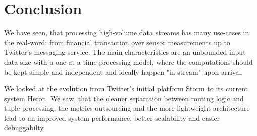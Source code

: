\documentclass[conference]{IEEEtran}
\begin{document}
\section{Conclusion}
\label{sec:Conclusion}

We have seen, that processing high-volume data streams has many use-cases in the real-word: from financial transaction over sensor measurements up to Twitter's messaging service.
The main characteristics are an unbounded input data size with a one-at-a-time processing model, where the computations should be kept simple and independent and ideally happen "in-stream" upon arrival.

We looked at the evolution from Twitter's initial platform Storm to its current system Heron.
We saw, that the cleaner separation between routing logic and tuple processing, the metrics outsourcing and the more lightweight architecture lead to an improved system performance, better scalability and easier debuggabilty.



\end{document}
